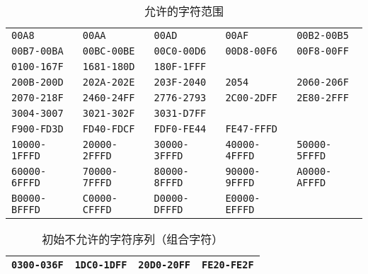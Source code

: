 \begin{table}[h!]
  \centering
  \caption{允许的字符范围}
  \begin{tabular}{|lllll|}
    \hline
    \texttt{00A8}          & \texttt{00AA}        & \texttt{00AD}        &
      \texttt{00AF}        & \texttt{00B2-00B5}                               \\
    \texttt{00B7-00BA}     & \texttt{00BC-00BE}   & \texttt{00C0-00D6}   &
      \texttt{00D8-00F6}   & \texttt{00F8-00FF}                               \\
    \texttt{0100-167F}     & \texttt{1681-180D}   & \texttt{180F-1FFF}   &
                           &                                                  \\
    \texttt{200B-200D}     & \texttt{202A-202E}   & \texttt{203F-2040}   &
      \texttt{2054}        & \texttt{2060-206F}                               \\
    \texttt{2070-218F}     & \texttt{2460-24FF}   & \texttt{2776-2793}   &
      \texttt{2C00-2DFF}   & \texttt{2E80-2FFF}                               \\
    \texttt{3004-3007}     & \texttt{3021-302F}   & \texttt{3031-D7FF}   &
                           &                                                  \\
    \texttt{F900-FD3D}     & \texttt{FD40-FDCF}   & \texttt{FDF0-FE44}   &
      \texttt{FE47-FFFD}   &                                                  \\
    \texttt{10000-1FFFD}   & \texttt{20000-2FFFD} & \texttt{30000-3FFFD} &
      \texttt{40000-4FFFD} & \texttt{50000-5FFFD}                             \\
    \texttt{60000-6FFFD}   & \texttt{70000-7FFFD} & \texttt{80000-8FFFD} &
      \texttt{90000-9FFFD} & \texttt{A0000-AFFFD}                             \\
    \texttt{B0000-BFFFD}   & \texttt{C0000-CFFFD} & \texttt{D0000-DFFFD} &
      \texttt{E0000-EFFFD} &                                                  \\
    \hline
  \end{tabular}
  \label{tab:iso10646allowed}
\end{table}

\begin{table}[h!]
  \centering
  \caption{初始不允许的字符序列（组合字符）}
  \begin{tabular}{|llll|}
    \hline
    \texttt{0300-036F} & \texttt{1DC0-1DFF} & \texttt{20D0-20FF} &
      \texttt{FE20-FE2F}                                                      \\
    \hline
  \end{tabular}
  \label{tab:iso10646disallowed}
\end{table}


